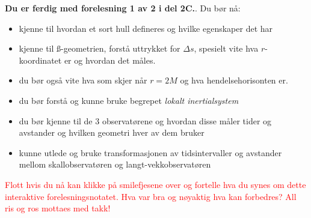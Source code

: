\documentclass{beamer}
\let\hrefori\href
\renewcommand{\href}[2]{{\setlength{\fboxsep}{1pt}\colorbox{sunset}{\hrefori{#1}{#2}}}}
\newcommand{\pagebutton}[1]{\setbeamertemplate{button}{\tikz\node[inner xsep = 5pt, draw = structure!90, fill = green(ryb), rounded corners = 8pt]{\color{amber}\Large\insertbuttontext};}\beamerbutton{#1}}
\begin{document}
\begin{frame}
\label{oppsummering}
\hyperlink{obs29}{\pagebutton{\small Forrige side}}\href{https://nettskjema.no/a/171674}{ \Changey[1][yellow]{-2}}
{\bf Du er ferdig med forelesning 1 av 2 i del 2C.}. Du bør nå:
\begin{itemize}
\item kjenne til hvordan et sort hull defineres og hvilke egenskaper det har
\item kjenne til \ss-geometrien, forstå uttrykket for $\Delta s$, spesielt vite hva $r$-koordinatet er og hvordan det måles.
\item du bør også vite hva som skjer når $r=2M$ og hva hendelsehorisonten er.
\item du bør forstå og kunne bruke begrepet {\it lokalt inertialsystem}
\item du bør kjenne til de 3 observatørene og hvordan disse måler tider og avstander og hvilken geometri hver av dem bruker
\item kunne utlede og bruke transformasjonen av tidsintervaller og avstander mellom skallobservatøren og langt-vekkobservatøren
\end{itemize}
\textcolor{red}{Flott hvis du nå kan klikke på smilefjesene over og fortelle hva du synes om dette interaktive forelesningsnotatet. Hva var bra og nøyaktig hva kan forbedres? All ris og ros mottaes med takk!}
\end{frame}
\end{document}
